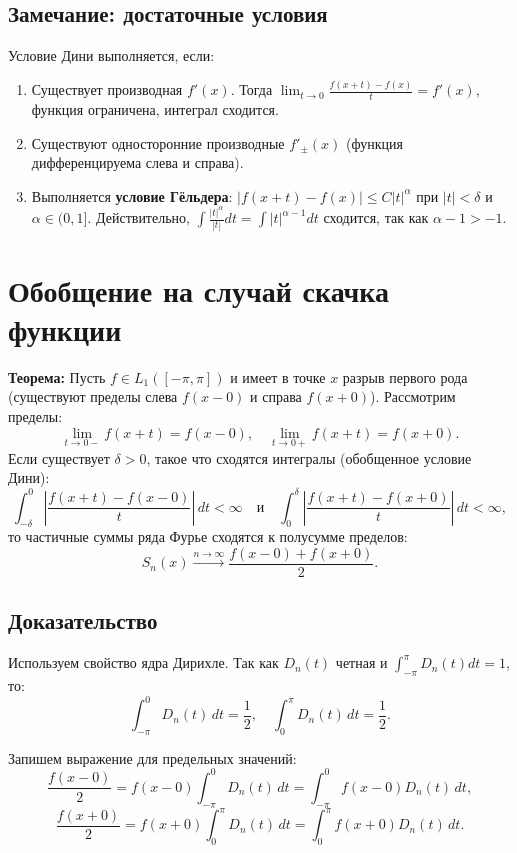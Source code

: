 \documentclass[12pt,a4paper,openany]{book}
\begin{document}
\subsection{Замечание: достаточные условия}
Условие Дини выполняется, если:
\begin{enumerate}
    \item Существует производная $f'(x)$. Тогда $\lim_{t \to 0} \frac{f(x+t)-f(x)}{t} = f'(x)$, функция ограничена, интеграл сходится.
    \item Существуют односторонние производные $f'_{\pm}(x)$ (функция дифференцируема слева и справа).
    \item Выполняется \textbf{условие Гёльдера}: $|f(x+t) - f(x)| \le C |t|^\alpha$ при $|t| < \delta$ и $\alpha \in (0, 1]$.
    Действительно, $\int \frac{|t|^\alpha}{|t|} dt = \int |t|^{\alpha-1} dt$ сходится, так как $\alpha - 1 > -1$.
\end{enumerate}

\section{Обобщение на случай скачка функции}

\textbf{Теорема:}
Пусть $f \in L_1([-\pi, \pi])$ и имеет в точке $x$ разрыв первого рода (существуют пределы слева $f(x-0)$ и справа $f(x+0)$).
Рассмотрим пределы:
$$ \lim_{t \to 0-} f(x+t) = f(x-0), \quad \lim_{t \to 0+} f(x+t) = f(x+0). $$
Если существует $\delta > 0$, такое что сходятся интегралы (обобщенное условие Дини):
$$ \int_{-\delta}^{0} \left| \frac{f(x+t) - f(x-0)}{t} \right| \, dt < \infty \quad \text{и} \quad \int_{0}^{\delta} \left| \frac{f(x+t) - f(x+0)}{t} \right| \, dt < \infty, $$
то частичные суммы ряда Фурье сходятся к полусумме пределов:
$$ S_n(x) \xrightarrow{n \to \infty} \frac{f(x-0) + f(x+0)}{2}. $$

\subsection{Доказательство}

Используем свойство ядра Дирихле. Так как $D_n(t)$ четная и $\int_{-\pi}^{\pi} D_n(t) dt = 1$, то:
$$ \int_{-\pi}^{0} D_n(t) \, dt = \frac{1}{2}, \quad \int_{0}^{\pi} D_n(t) \, dt = \frac{1}{2}. $$

Запишем выражение для предельных значений:
$$ \frac{f(x-0)}{2} = f(x-0) \int_{-\pi}^{0} D_n(t) \, dt = \int_{-\pi}^{0} f(x-0) D_n(t) \, dt, $$
$$ \frac{f(x+0)}{2} = f(x+0) \int_{0}^{\pi} D_n(t) \, dt = \int_{0}^{\pi} f(x+0) D_n(t) \, dt. $$
\end{document}
